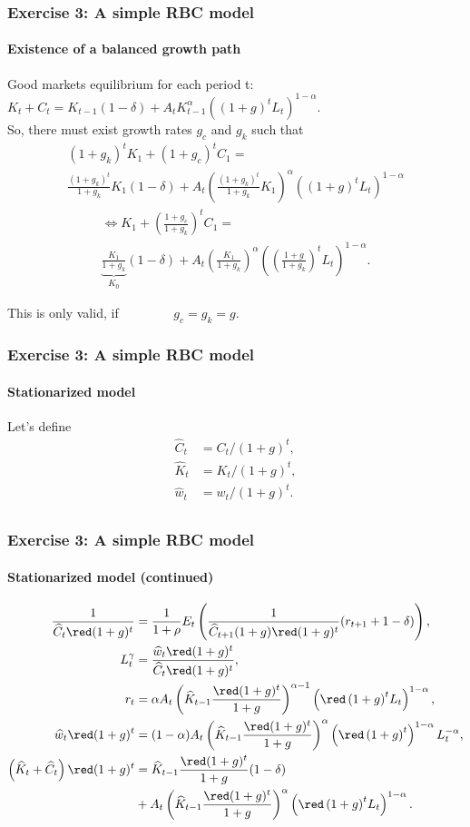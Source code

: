\documentclass{beamer} %
\begin{document}
\begin{frame}\frametitle{Exercise 3: A simple RBC model}
  \framesubtitle{Existence of a balanced growth path}
Good markets equilibrium for each period t: $ K_t+C_t = K_{t-1}(1-\delta)+A_tK_{t-1}^\alpha\left( \left( 1+g\right) ^{t}L_t\right)^{1-\alpha}$.\\
So, there must exist growth rates $g_c$ and $g_k$ such that
\begin{multline*}
(1+g_k)^tK_1 + (1+g_c)^tC_1 =\\
 \frac{(1+g_k)^t}{1+g_k}K_1(1-\delta) + A_t\left(\frac{(1+g_k)^t}{1+g_k}K_1\right)^\alpha\left( \left( 1+g\right) ^{t}L_t\right)^{1-\alpha}
\end{multline*}
\begin{multline*}
\Leftrightarrow K_1 + \left(\frac{1+g_c}{1+g_k}\right)^tC_1 =\\
 \underbrace{\frac{K_1}{1+g_k}}_{K_0} (1-\delta) + A_t\left(\frac{K_1}{1+g_k}\right)^\alpha\left( \left( \frac{1+g}{1+g_k}\right) ^{t}L_t\right)^{1-\alpha}.
\end{multline*}

This is only valid, if $\qquad\qquad g_c=g_k=g$.

\end{frame}

\begin{frame}\frametitle{Exercise 3: A simple RBC model}
  \framesubtitle{Stationarized model}
  Let's define
  \begin{align*}
    \widehat{C}_t &= C_t/(1+g)^t,\\
    \widehat{K}_t &= K_t/(1+g)^t,\\
    \widehat{w}_t &= w_t/(1+g)^t.\\
  \end{align*}
\end{frame}

\begin{frame}\frametitle{Exercise 3: A simple RBC model}
  \framesubtitle{Stationarized model (continued)}
  \begin{align*}
    \frac{1}{\widehat{C}_t{\red(1+g)^t}}&=\frac{1}{1+\rho}E_t\left(\frac{1}{\widehat{C}_{t+1}(1+g){\red(1+g)^t}}(r_{t+1}+1-\delta)\right),\\
    L_t^\gamma&=\frac{\widehat{w}_t{\red(1+g)^t}}{\widehat{C}_t{\red(1+g)^t}},\\
    r_t &= \alpha A_t\left(\widehat{K}_{t-1}\frac{\red(1+g)^t}{1+g}\right)^{\alpha-1}\left( {\red\left( 1+g\right) ^{t}}L_t\right)^{1-\alpha},\\
    \widehat{w}_t{\red(1+g)^t} &= (1-\alpha) A_t\left(\widehat{K}_{t-1}\frac{\red(1+g)^t}{1+g}\right)^\alpha\left( {\red\left( 1+g\right) ^{t}}\right)^{1-\alpha}L_t^{-\alpha},\\
    \left(\widehat{K}_t+\widehat{C}_t\right){\red(1+g)^t} &= \widehat{K}_{t-1}\frac{\red(1+g)^t}{1+g}(1-\delta)\\
&+A_t\left(\widehat{K}_{t-1}\frac{\red(1+g)^t}{1+g}\right)^\alpha\left( {\red\left( 1+g\right) ^{t}}L_t\right)^{1-\alpha}.
  \end{align*}

\end{frame}
\end{document}
